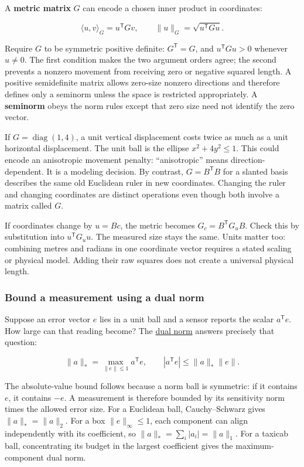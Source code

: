 A \textbf{metric matrix} \(G\) can encode a chosen inner product in coordinates:

\[
\langle u,v\rangle_G=u^{\mathsf T}Gv,\qquad
\|u\|_G=\sqrt{u^{\mathsf T}Gu}.
\]

Require \(G\) to be symmetric positive definite: \(G^{\mathsf T}=G\), and \(u^{\mathsf T}Gu>0\) whenever \(u\ne0\). The first condition makes the two argument orders agree; the second prevents a nonzero movement from receiving zero or negative squared length. A positive semidefinite matrix allows zero-size nonzero directions and therefore defines only a seminorm unless the space is restricted appropriately. A \textbf{seminorm} obeys the norm rules except that zero size need not identify the zero vector.

If \(G=\operatorname{diag}(1,4)\), a unit vertical displacement costs twice as much as a unit horizontal displacement. The unit ball is the ellipse \(x^2+4y^2\le1\). This could encode an anisotropic movement penalty: ``anisotropic'' means direction-dependent. It is a modeling decision. By contrast, \(G=B^{\mathsf T}B\) for a slanted basis describes the same old Euclidean ruler in new coordinates. Changing the ruler and changing coordinates are distinct operations even though both involve a matrix called \(G\).

If coordinates change by \(u=Bc\), the metric becomes \(G_c=B^{\mathsf T}G_uB\). Check this by substitution into \(u^{\mathsf T}G_uu\). The measured size stays the same. Units matter too: combining metres and radians in one coordinate vector requires a stated scaling or physical model. Adding their raw squares does not create a universal physical length.

\subsubsection{Bound a measurement using a dual norm}\label{01-foundations-i-ch017-bound-a-measurement-using-a-dual-norm}

\hypertarget{01-foundations-i-ch017-bound-a-measurement-using-a-dual-norm}{}

Suppose an error vector \(e\) lies in a unit ball and a sensor reports the scalar \(a^{\mathsf T}e\). How large can that reading become? The \hyperref[appendix-d6d9dbbe3c14]{dual norm} answers precisely that question:

\[
\|a\|_* = \max_{\|e\|\le1} a^{\mathsf T}e,
\qquad |a^{\mathsf T}e|\le\|a\|_*\|e\|.
\]

The absolute-value bound follows because a norm ball is symmetric: if it contains \(e\), it contains \(-e\). A measurement is therefore bounded by its sensitivity norm times the allowed error size. For a Euclidean ball, Cauchy--Schwarz gives \(\|a\|_* =\|a\|_2\). For a box \(\|e\|_\infty\le1\), each component can align independently with its coefficient, so \(\|a\|_* =\sum_i|a_i|=\|a\|_1\). For a taxicab ball, concentrating its budget in the largest coefficient gives the maximum-component dual norm.

